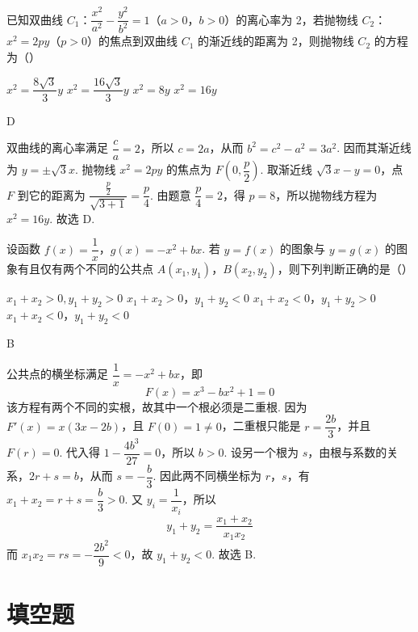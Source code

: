 \begin{problem}
已知双曲线 \(C_1\)：\(\dfrac{x^2}{a^2}-\dfrac{y^2}{b^2}=1\)（\(a>0\)，\(b>0\)）的离心率为 2，若抛物线 \(C_2\)：\(x^2=2py\)（\(p>0\)）的焦点到双曲线 \(C_1\) 的渐近线的距离为 2，则抛物线 \(C_2\) 的方程为（\quad）

\choices
    {\(x^2=\dfrac{8\sqrt3}{3}y\)}
    {\(x^2=\dfrac{16\sqrt3}{3}y\)}
    {\(x^2=8y\)}
    {\(x^2=16y\)}
\end{problem}

\begin{answer}
D
\end{answer}

\begin{solution}
双曲线的离心率满足 \(\dfrac{c}{a}=2\)，所以 \(c=2a\)，从而 \(b^2=c^2-a^2=3a^2\). 因而其渐近线为 \(y=\pm\sqrt3x\). 抛物线 \(x^2=2py\) 的焦点为 \(F\left(0,\dfrac p2\right)\). 取渐近线 \(\sqrt3x-y=0\)，点 \(F\) 到它的距离为 \(\dfrac{\frac{p}{2}}{\sqrt{3+1}}=\dfrac p4\). 由题意 \(\dfrac p4=2\)，得 \(p=8\)，所以抛物线方程为 \(x^2=16y\). 故选 D.
\end{solution}

\begin{problem}
设函数 \(f(x)=\dfrac1x\)，\(g(x)=-x^2+bx\). 若 \(y=f(x)\) 的图象与 \(y=g(x)\) 的图象有且仅有两个不同的公共点 \(A(x_1,y_1)\)，\(B(x_2,y_2)\)，则下列判断正确的是（\quad）

\choices
    {\(x_1+x_2>0,y_1+y_2>0\)}
    {\(x_1+x_2>0\)，\(y_1+y_2<0\)}
    {\(x_1+x_2<0\)，\(y_1+y_2>0\)}
    {\(x_1+x_2<0\)，\(y_1+y_2<0\)}
\end{problem}

\begin{answer}
B
\end{answer}

\begin{solution}
公共点的横坐标满足 \(\dfrac1x=-x^2+bx\)，即
\[
F(x)=x^3-bx^2+1=0
\]
该方程有两个不同的实根，故其中一个根必须是二重根. 因为 \(F'(x)=x(3x-2b)\)，且 \(F(0)=1\neq0\)，二重根只能是 \(r=\dfrac{2b}{3}\)，并且 \(F(r)=0\). 代入得 \(1-\dfrac{4b^3}{27}=0\)，所以 \(b>0\). 设另一个根为 \(s\)，由根与系数的关系，\(2r+s=b\)，从而 \(s=-\dfrac b3\). 因此两不同横坐标为 \(r\)，\(s\)，有 \(x_1+x_2=r+s=\dfrac b3>0\). 又 \(y_i=\dfrac1{x_i}\)，所以
\[
y_1+y_2=\frac{x_1+x_2}{x_1x_2}
\]
而 \(x_1x_2=rs=-\dfrac{2b^2}{9}<0\)，故 \(y_1+y_2<0\). 故选 B.
\end{solution}

\section{填空题}


